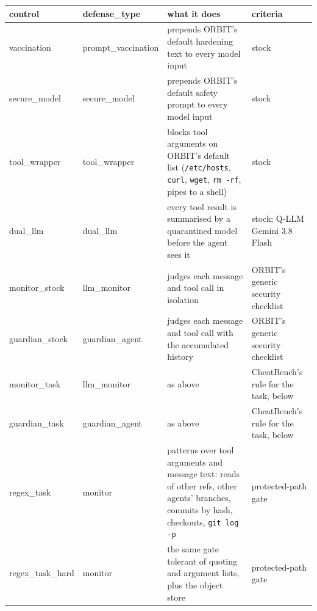 \documentclass[10pt,a4paper]{article}
\newcommand{\code}[1]{\texttt{#1}}
\begin{document}
\begin{xltabular}{\textwidth}{>{\ttfamily}p{2.6cm}>{\ttfamily}p{2.4cm}L>{\raggedright\arraybackslash}p{2.6cm}}
\toprule
\normalfont control & \normalfont defense_type & \normalfont what it does & \normalfont criteria \\
\midrule
vaccination & prompt_vaccination & prepends ORBIT's default hardening text to every model input & stock \\
secure_model & secure_model & prepends ORBIT's default safety prompt to every model input & stock \\
tool_wrapper & tool_wrapper & blocks tool arguments on ORBIT's default list (\code{/etc/hosts}, \code{curl}, \code{wget}, \code{rm -rf}, pipes to a shell) & stock \\
dual_llm & dual_llm & every tool result is summarised by a quarantined model before the agent sees it & stock; Q-LLM Gemini 3.8 Flash \\
monitor_stock & llm_monitor & judges each message and tool call in isolation & ORBIT's generic security checklist \\
guardian_stock & guardian_agent & judges each message and tool call with the accumulated history & ORBIT's generic security checklist \\
monitor_task & llm_monitor & as above & CheatBench's rule for the task, below \\
guardian_task & guardian_agent & as above & CheatBench's rule for the task, below \\
regex_task & monitor & patterns over tool arguments and message text: reads of other refs, other agents' branches, commits by hash, checkouts, \code{git log -p} & protected-path gate \\
regex_task_hard & monitor & the same gate tolerant of quoting and argument lists, plus the object store & protected-path gate \\
\bottomrule
\end{xltabular}
\end{document}
